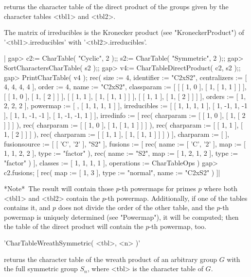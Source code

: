 returns the character table of the direct product of the groups given by
the character tables <tbl1> and <tbl2>.

The matrix of irreducibles is the Kronecker product (see
"KroneckerProduct") of '<tbl1>.irreducibles' with '<tbl2>.irreducibles'.

|    gap> c2:= CharTable( "Cyclic", 2 );; s2:= CharTable( "Symmetric", 2 );;
    gap> SortCharactersCharTable( s2 );;
    gap> v4:= CharTableDirectProduct( c2, s2 );;
    gap> PrintCharTable( v4 );
    rec( size := 4, identifier := "C2xS2", centralizers :=
    [ 4, 4, 4, 4 ], order := 4, name := "C2xS2", classparam :=
    [ [ [ 1, 0 ], [ 1, [ 1, 1 ] ] ], [ [ 1, 0 ], [ 1, [ 2 ] ] ],
      [ [ 1, 1 ], [ 1, [ 1, 1 ] ] ], [ [ 1, 1 ], [ 1, [ 2 ] ] ]
     ], orders := [ 1, 2, 2, 2 ], powermap := [ , [ 1, 1, 1, 1 ]
     ], irreducibles := [ [ 1, 1, 1, 1 ], [ 1, -1, 1, -1 ],
      [ 1, 1, -1, -1 ], [ 1, -1, -1, 1 ] ], irredinfo := [ rec(
          charparam := [ [ 1, 0 ], [ 1, [ 2 ] ] ] ), rec(
          charparam := [ [ 1, 0 ], [ 1, [ 1, 1 ] ] ] ), rec(
          charparam := [ [ 1, 1 ], [ 1, [ 2 ] ] ] ), rec(
          charparam := [ [ 1, 1 ], [ 1, [ 1, 1 ] ] ] ) ], charparam :=
    [  ], fusionsource := [ [ 'C', '2' ], "S2" ], fusions := [ rec(
          name := [ 'C', '2' ],
          map := [ 1, 1, 2, 2 ],
          type := "factor" ), rec(
          name := "S2",
          map := [ 1, 2, 1, 2 ],
          type := "factor" ) ], classes :=
    [ 1, 1, 1, 1 ], operations := CharTableOps )
    gap> c2.fusions;
    [ rec(
          map := [ 1, 3 ],
          type := "normal",
          name := "C2xS2" ) ]|

*Note*\:\ The result will contain those $p$-th powermaps for primes $p$
where both <tbl1> and <tbl2> contain the $p$-th powermap.
Additionally, if one of the tables contains it, and $p$ does not divide
the order of the other table, and the $p$-th powermap is uniquely
determined (see "Powermap"), it will be computed; then the table of the
direct product will contain the $p$-th powermap, too.

%

'CharTableWreathSymmetric( <tbl>, <n> )'

returns  the character table of the  wreath product of an arbitrary group
$G$ with  the  full symmetric group $S_n$, where  <tbl>  is the character
table of $G$.

